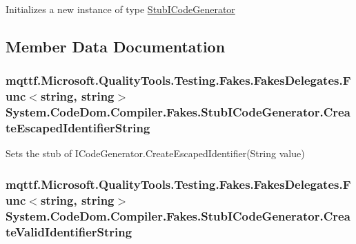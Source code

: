 Initializes a new instance of type \hyperlink{class_system_1_1_code_dom_1_1_compiler_1_1_fakes_1_1_stub_i_code_generator}{Stub\-I\-Code\-Generator}



\subsection{Member Data Documentation}
\hypertarget{class_system_1_1_code_dom_1_1_compiler_1_1_fakes_1_1_stub_i_code_generator_ae9840dc644e33cf5088174607e950126}{
\subsubsection[{Create\-Escaped\-Identifier\-String}]{\setlength{\rightskip}{0pt plus 5cm}mqttf.\-Microsoft.\-Quality\-Tools.\-Testing.\-Fakes.\-Fakes\-Delegates.\-Func$<$string, string$>$ System.\-Code\-Dom.\-Compiler.\-Fakes.\-Stub\-I\-Code\-Generator.\-Create\-Escaped\-Identifier\-String}}\label{class_system_1_1_code_dom_1_1_compiler_1_1_fakes_1_1_stub_i_code_generator_ae9840dc644e33cf5088174607e950126}


Sets the stub of I\-Code\-Generator.\-Create\-Escaped\-Identifier(\-String value)

\hypertarget{class_system_1_1_code_dom_1_1_compiler_1_1_fakes_1_1_stub_i_code_generator_a02c84c4b3704b5c131f12d8bf37ac973}{
\subsubsection[{Create\-Valid\-Identifier\-String}]{\setlength{\rightskip}{0pt plus 5cm}mqttf.\-Microsoft.\-Quality\-Tools.\-Testing.\-Fakes.\-Fakes\-Delegates.\-Func$<$string, string$>$ System.\-Code\-Dom.\-Compiler.\-Fakes.\-Stub\-I\-Code\-Generator.\-Create\-Valid\-Identifier\-String}}\label{class_system_1_1_code_dom_1_1_compiler_1_1_fakes_1_1_stub_i_code_generator_a02c84c4b3704b5c131f12d8bf37ac973}



